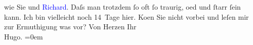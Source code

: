                wie Sie und \textcolor{blue}{Richard}{}\ledrightnote{\textcolor{blue}{Richard Beer-Hofmann}}. Daſs man trotzdem ſo  oft ſo traurig, oed und ſtarr ſein kann.\pend
           \pstart
           Ich bin vielleicht noch 14 Tage hier. Ko{\geminationm}en Sie nicht
               vorbei und leſen mir zur Ermuthigung was vor?\pend
           \pstart
           Von Herzen Ihr{\\[\baselineskip]}\spacefill\mbox{Hugo.}\pend
           \leftskip=0em{}\endnumbering{}  
      